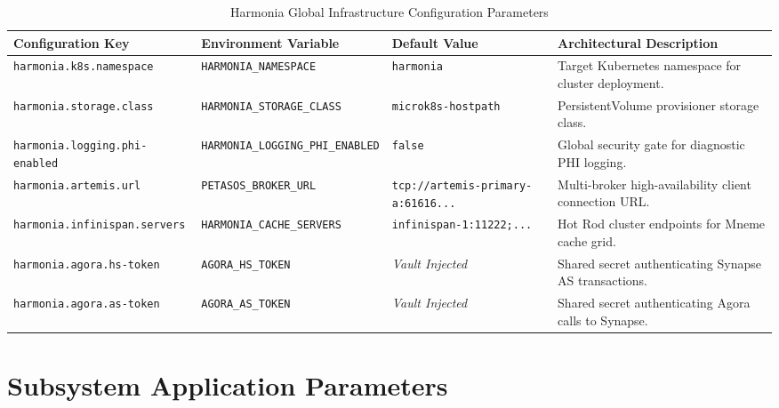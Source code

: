 \begin{table}[htbp]
\centering
\scriptsize
\begin{tabularx}{\textwidth}{l P{4.0cm} P{3.5cm} Y}
\toprule
\textbf{Configuration Key} & \textbf{Environment Variable} & \textbf{Default Value} & \textbf{Architectural Description} \\
\midrule
\texttt{harmonia.k8s.namespace} & \nolinkurl{HARMONIA_NAMESPACE} & \texttt{harmonia} & Target Kubernetes namespace for cluster deployment. \\
\addlinespace
\texttt{harmonia.storage.class} & \nolinkurl{HARMONIA_STORAGE_CLASS} & \texttt{microk8s-hostpath} & PersistentVolume provisioner storage class. \\
\addlinespace
\texttt{harmonia.logging.phi-enabled} & \nolinkurl{HARMONIA_LOGGING_PHI_ENABLED} & \texttt{false} & Global security gate for diagnostic PHI logging. \\
\addlinespace
\texttt{harmonia.artemis.url} & \nolinkurl{PETASOS_BROKER_URL} & \nolinkurl{tcp://artemis-primary-a:61616...} & Multi-broker high-availability client connection URL. \\
\addlinespace
\texttt{harmonia.infinispan.servers} & \nolinkurl{HARMONIA_CACHE_SERVERS} & \texttt{infinispan-1:11222;...} & Hot Rod cluster endpoints for Mneme cache grid. \\
\addlinespace
\texttt{harmonia.agora.hs-token} & \nolinkurl{AGORA_HS_TOKEN} & \textit{Vault Injected} & Shared secret authenticating Synapse AS transactions. \\
\addlinespace
\texttt{harmonia.agora.as-token} & \nolinkurl{AGORA_AS_TOKEN} & \textit{Vault Injected} & Shared secret authenticating Agora calls to Synapse. \\
\bottomrule
\end{tabularx}
\caption{Harmonia Global Infrastructure Configuration Parameters}
\label{tab:app_config_global}
\end{table}

\newpage
\section{Subsystem Application Parameters}

